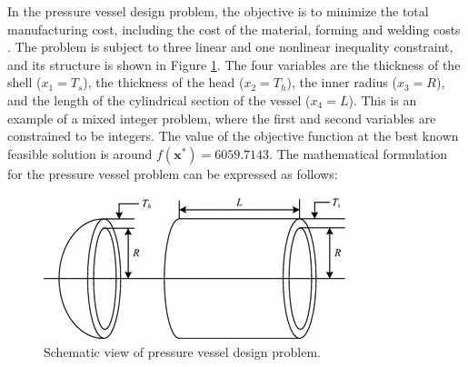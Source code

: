 

In the pressure vessel design problem, the objective is to minimize the total manufacturing cost, including the cost of the material, forming and welding costs \citep{PV}. The problem is subject to three linear and one nonlinear inequality constraint, and its structure is shown in Figure \ref{fig:PV}. The four variables are the thickness of the shell ($x_1 = T_s$), the thickness of the head ($x_2 = T_h$), the inner radius ($x_3 = R$), and the length of the cylindrical section of the vessel ($x_4 = L$). This is an example of a mixed integer problem, where the first and second variables are constrained to be integers. The value of the objective function at the best known feasible solution is around $f(\bm{x}^*) = 6059.7143$. The mathematical formulation for the pressure vessel problem can be expressed as follows:

\vspace{-0.5cm}



\vspace{0.5cm}

\begin{figure}[h]
    \begin{center}
    \includegraphics[scale=0.6]{Imgs/PV.png}
    \end{center}
    \captionsetup{justification=centering}
    \caption{Schematic view of pressure vessel design problem.}\label{fig:PV}
\end{figure}
